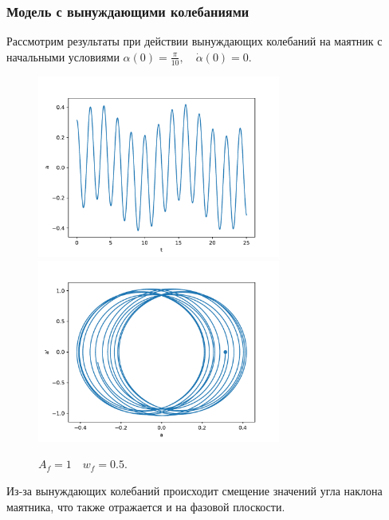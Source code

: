         \subsubsection{Модель с вынуждающими колебаниями}
            Рассмотрим результаты при действии вынуждающих колебаний на маятник с начальными условиями $\alpha(0) = \frac{\pi}{10}, \quad \dot{\alpha}(0) = 0$.
            \begin{figure}[H]
                \centering
                \includegraphics[width=8cm]{pictures/4resonance1.pdf}
                \includegraphics[width=8cm]{pictures/4resonance1p.pdf}
                \caption{$A_f = 1 \quad w_f = 0.5$.}
            \end{figure}
            Из-за вынуждающих колебаний происходит смещение значений угла наклона маятника, что также отражается и на фазовой плоскости.

